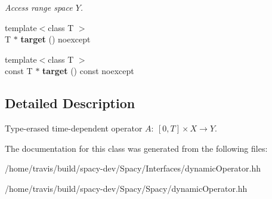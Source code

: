 \begin{DoxyCompactItemize}
\begin{DoxyCompactList}\small\item\em \-Access range space $Y$. \end{DoxyCompactList}\item 
\hypertarget{classSpacy_1_1DynamicOperator_a6d9ebf222c06c54000c0ecb3ec3b7769}{{\footnotesize template$<$class T $>$ }\\\-T $\ast$ {\bfseries target} () noexcept}\label{classSpacy_1_1DynamicOperator_a6d9ebf222c06c54000c0ecb3ec3b7769}

\item 
\hypertarget{classSpacy_1_1DynamicOperator_a47418fa10f47b00a8338983195372735}{{\footnotesize template$<$class T $>$ }\\const \-T $\ast$ {\bfseries target} () const noexcept}\label{classSpacy_1_1DynamicOperator_a47418fa10f47b00a8338983195372735}

\end{DoxyCompactItemize}


\subsection{\-Detailed \-Description}
\-Type-\/erased time-\/dependent operator $A:\ [0,T] \times X \to Y $. 

\-The documentation for this class was generated from the following files\-:\begin{DoxyCompactItemize}
\item 
/home/travis/build/spacy-\/dev/\-Spacy/\-Interfaces/dynamic\-Operator.\-hh\item 
/home/travis/build/spacy-\/dev/\-Spacy/\-Spacy/dynamic\-Operator.\-hh\end{DoxyCompactItemize}
